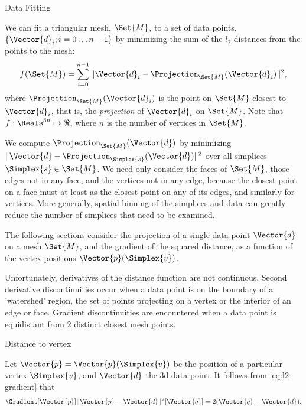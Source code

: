 \begin{plSection}{Data Fitting}
\label{sec:data-fitting}

We can fit a triangular mesh, $\Set{M}$, to a set of data points, 
$\{\Vector{d}_i; i=0 \ldots n-1\}$
by minimizing the sum of the $l_2$ distances from the points to the mesh:
\begin{equation}
f(\Set{M}) = \sum_{i=0}^{n-1} 
\|\Vector{d}_i - \Projection_{\Set{M}} (\Vector{d}_i)\|^2 ,
\end{equation}
where $\Projection_{\Set{M}} (\Vector{d}_i)$ 
is the point on $\Set{M}$ closest to $\Vector{d}_i$,
that is, the {\em projection} of $\Vector{d}_i$ on $\Set{M}$.
Note that $f:\Reals^{3n} \mapsto \Re$,
where $n$ is the number of vertices in $\Set{M}$.

We compute $\Projection_{\Set{M}} (\Vector{d})$ by minimizing  
$\|\Vector{d}-\Projection_{\Simplex{s}} (\Vector{d})\|^2$
over all simplices $\Simplex{s} \in \Set{M}$.
We need only consider the faces of $\Set{M}$,
those edges not in any face,
and the vertices not in any edge,
because the closest point on a face must at least
as the closest point on any of its edges,
and similarly for vertices.
More generally, spatial binning of the simplices and data can greatly
reduce the number of simplices that need to be examined.

The following sections consider the projection of a single
data point $\Vector{d}$ on a mesh $\Set{M}$,
and the gradient of the squared distance,
as a function of the vertex positions $\Vector{p}(\Simplex{v})$.

Unfortunately, derivatives of the distance function are not continuous.
Second derivative discontinuities occur
when a data point is on the boundary
of a 'watershed' region, the set of points
projecting on a vertex or the interior of an edge or face.
Gradient discontinuities are encountered
when a data point is equidistant from 2 distinct closest mesh points.

\begin{plSection}{Distance to vertex}
\label{sec:Distance-to-vertex}

Let $\Vector{p} = \Vector{p}(\Simplex{v})$ 
be the position of a particular vertex $\Simplex{v}$,
and $\Vector{d}$ the 3d data point.
It follows from \cref{eq:l2-gradient} that
\begin{equation}
\label{eq:vertex-distance-gradient}
\Gradient[\Vector{p}]{\|\Vector{p}-\Vector{d}\|^2}[\Vector{q}] 
= 2 ( \Vector{q}-\Vector{d} ).
\end{equation}


\end{plSection}
\end{plSection}
